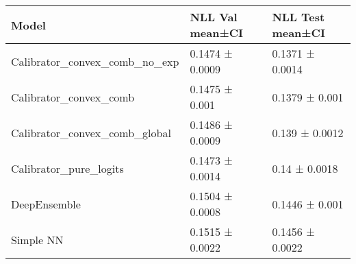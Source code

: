 \begin{tabular}{lll}
\toprule
Model & NLL Val mean±CI & NLL Test mean±CI \\
\midrule
Calibrator_convex_comb_no_exp & 0.1474 ± 0.0009 & 0.1371 ± 0.0014 \\
Calibrator_convex_comb & 0.1475 ± 0.001 & 0.1379 ± 0.001 \\
Calibrator_convex_comb_global & 0.1486 ± 0.0009 & 0.139 ± 0.0012 \\
Calibrator_pure_logits & 0.1473 ± 0.0014 & 0.14 ± 0.0018 \\
DeepEnsemble & 0.1504 ± 0.0008 & 0.1446 ± 0.001 \\
Simple NN & 0.1515 ± 0.0022 & 0.1456 ± 0.0022 \\
\bottomrule
\end{tabular}
